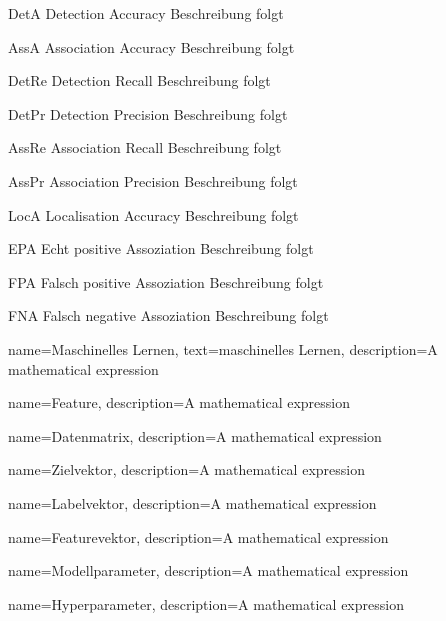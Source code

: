 \newglossaryentrywithacronym
{DetA}
{Detection Accuracy}
{Beschreibung folgt}

\newglossaryentrywithacronym
{AssA}
{Association Accuracy}
{Beschreibung folgt}

\newglossaryentrywithacronym
{DetRe}
{Detection Recall}
{Beschreibung folgt}

\newglossaryentrywithacronym
{DetPr}
{Detection Precision}
{Beschreibung folgt}

\newglossaryentrywithacronym
{AssRe}
{Association Recall}
{Beschreibung folgt}

\newglossaryentrywithacronym
{AssPr}
{Association Precision}
{Beschreibung folgt}

\newglossaryentrywithacronym
{LocA}
{Localisation Accuracy}
{Beschreibung folgt}

\newglossaryentrywithacronym
{EPA}
{Echt positive Assoziation}
{Beschreibung folgt}

\newglossaryentrywithacronym
{FPA}
{Falsch positive Assoziation}
{Beschreibung folgt}

\newglossaryentrywithacronym
{FNA}
{Falsch negative Assoziation}
{Beschreibung folgt}


{
        name=Maschinelles Lernen,
        text=maschinelles Lernen,
        description={A mathematical expression}
}

{
        name=Feature,
        description={A mathematical expression}
}

{
        name=Datenmatrix,
        description={A mathematical expression}
}

{
        name=Zielvektor,
        description={A mathematical expression}
}

{
        name=Labelvektor,
        description={A mathematical expression}
}

{
        name=Featurevektor,
        description={A mathematical expression}
}

{
        name=Modellparameter,
        description={A mathematical expression}
}

{
        name=Hyperparameter,
        description={A mathematical expression}
}

